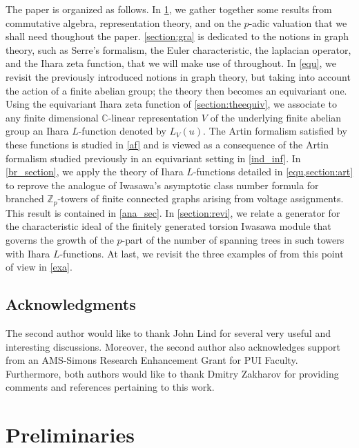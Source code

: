 \documentclass[11pt]{amsart}
\numberwithin{equation}{section}
\theoremstyle{remark}
\theoremstyle{definition}
\begin{document}
The paper is organized as follows.  In \cref{section:pre}, we gather together some results from commutative algebra, representation theory, and on the $p$-adic valuation that we shall need thoughout the paper.  \cref{section:gra} is dedicated to the notions in graph theory, such as Serre's formalism, the Euler characteristic, the laplacian operator, and the Ihara zeta function, that we will make use of throughout.  In \cref{equ}, we revisit the previously introduced notions in graph theory, but taking into account the action of a finite abelian group; the theory then becomes an equivariant one. Using the equivariant Ihara zeta function of \cref{section:theequiv}, we associate to any finite dimensional $\mathbb{C}$-linear representation $V$ of the underlying finite abelian group an Ihara $L$-function denoted by $L_{V}(u)$.  The Artin formalism satisfied by these functions is studied in \cref{af} and is viewed as a consequence of the Artin formalism studied previously in an equivariant setting in \cref{ind_inf}.  In \cref{br_section}, we apply the theory of Ihara $L$-functions detailed in \cref{equ,section:art} to reprove the analogue of Iwasawa's asymptotic class number formula for branched $\mathbb{Z}_{p}$-towers of finite connected graphs arising from voltage assignments.  This result is contained in \cref{ana_sec}.  In \cref{section:revi}, we relate a generator for the characteristic ideal of the finitely generated torsion Iwasawa module that governs the growth of the $p$-part of the number of spanning trees in such towers with Ihara $L$-functions.  At last, we revisit the three examples of \cite[\S 6]{Gambheera/Vallieres:2024} from this point of view in \cref{exa}.

    

\subsection*{Acknowledgments}
The second author would like to thank John Lind for several very useful and interesting discussions.  Moreover, the second author also acknowledges support from an AMS-Simons Research Enhancement Grant for PUI Faculty.  Furthermore, both authors would like to thank Dmitry Zakharov for providing comments and references pertaining to this work.

\section{Preliminaries} \label{section:pre}
\end{document}
